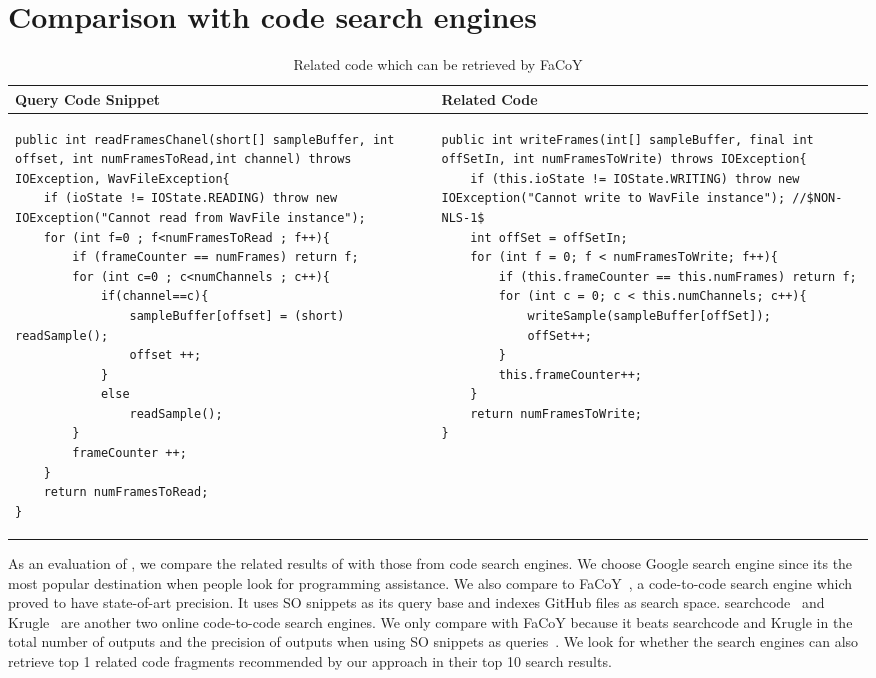 \section{Comparison with code search engines}
\label{sec:comparison}

\lstset{
	frame=none,
}
\begin{table*}[!h]\scriptsize
	\caption{Related code which can be retrieved by FaCoY}
	\label{tab:facoy-example}
	
	\setlength{\tabcolsep}{0.01\textwidth}
	\begin{tabular}{@{}p{}p{}@{}}
		\toprule
		Query Code Snippet & Related Code \\
		\midrule


\begin{lstlisting}
public int readFramesChanel(short[] sampleBuffer, int offset, int numFramesToRead,int channel) throws IOException, WavFileException{
	if (ioState != IOState.READING) throw new IOException("Cannot read from WavFile instance");
	for (int f=0 ; f<numFramesToRead ; f++){
		if (frameCounter == numFrames) return f;
		for (int c=0 ; c<numChannels ; c++){
			if(channel==c){
				sampleBuffer[offset] = (short) readSample();
				offset ++;
			}
			else
				readSample();
		}
		frameCounter ++;
	}
	return numFramesToRead;
}
\end{lstlisting}
		
		&
\begin{lstlisting}
public int writeFrames(int[] sampleBuffer, final int offSetIn, int numFramesToWrite) throws IOException{
	if (this.ioState != IOState.WRITING) throw new IOException("Cannot write to WavFile instance"); //$NON-NLS-1$
	int offSet = offSetIn;
	for (int f = 0; f < numFramesToWrite; f++){
		if (this.frameCounter == this.numFrames) return f;
		for (int c = 0; c < this.numChannels; c++){
			writeSample(sampleBuffer[offSet]);
			offSet++;
		}
		this.frameCounter++;
	}
	return numFramesToWrite;
}
		
\end{lstlisting}
\\

\bottomrule
	\end{tabular}
\end{table*}
		

As an evaluation of {\tool}, we compare the related results of {\tool} with those from code search engines. We choose Google search engine since its the most popular destination when people look for programming assistance. We also compare to {\ttt FaCoY}~\cite{kim2018Facoy}, a code-to-code search engine which proved to have state-of-art precision. It uses SO snippets as its query base and indexes GitHub files as search space. {\ttt searchcode}~\cite{searchcode} and {\ttt Krugle}~\cite{krugle} are another two online code-to-code search engines. We only compare with {\ttt FaCoY} because it beats {\ttt searchcode} and {\ttt Krugle} in the total number of outputs and the precision of outputs when using SO snippets as queries~\cite{kim2018Facoy}. 
We look for whether the search engines can also retrieve top 1 related code fragments recommended by our approach in their top 10 search results. 

